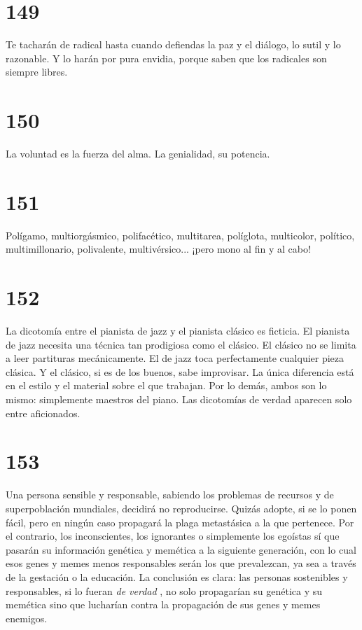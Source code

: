 \documentclass[a4paper,11pt,openright,twocolumn]{book}
\begin{document}
\section*{149}

Te tacharán de radical hasta cuando defiendas la paz y el diálogo, lo sutil y lo razonable. Y lo harán por
pura envidia, porque saben que los radicales son siempre libres. 

\section*{150}

La voluntad es la fuerza del alma. La genialidad, su potencia.

\section*{151}

Polígamo, multiorgásmico, polifacético, multitarea, políglota, multicolor, político, multimillonario,
polivalente, multivérsico... ¡pero mono al fin y al cabo!

\section*{152}

La dicotomía entre el pianista de jazz y el pianista clásico es ficticia. El pianista de jazz necesita
una técnica tan prodigiosa como el clásico. El clásico no se limita a leer partituras mecánicamente. El de jazz 
toca perfectamente cualquier pieza clásica. Y el clásico, si es de los buenos, sabe improvisar. La única
diferencia está en el estilo y el material sobre el que trabajan. Por lo demás, ambos son lo mismo: simplemente
maestros del piano. Las dicotomías de verdad aparecen solo entre aficionados. 

\section*{153}

Una persona sensible y responsable, sabiendo los problemas de recursos y de superpoblación mundiales,
decidirá no reproducirse. Quizás adopte, si se lo ponen fácil, pero en ningún caso propagará la
plaga metastásica a la que pertenece. Por el contrario, los inconscientes, los ignorantes o simplemente
los egoístas sí que pasarán su información genética y memética a la siguiente generación, con lo cual esos genes
y memes menos responsables serán los que prevalezcan, ya sea a través de la gestación o la educación. La
conclusión es clara: las personas sostenibles y responsables, si lo fueran {\it de verdad}  , no solo
propagarían su genética y su memética sino que lucharían contra la propagación de sus genes y memes enemigos.
\end{document}
